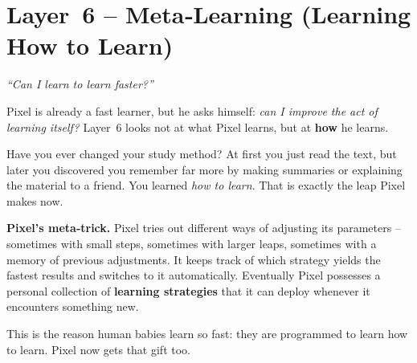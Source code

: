 \section{Layer~6 – Meta‑Learning (Learning How to Learn)}
\label{sec:layer6}

\begin{tcolorbox}[colback=blue!5, colframe=blue!60, title=\textbf{Superpower: The Meta‑Learner}]
\begin{center}
\textit{“Can I learn to learn faster?”}
\end{center}
\end{tcolorbox}

Pixel is already a fast learner, but he asks himself: \emph{can I
improve the act of learning itself?}  Layer~6 looks not at what Pixel
learns, but at \textbf{how} he learns.

\begin{tcolorbox}[colback=yellow!5, colframe=yellow!80, title=Real‑life analogy]
Have you ever changed your study method?  At first you just read the
text, but later you discovered you remember far more by making
summaries or explaining the material to a friend.  You learned
\emph{how to learn}.  That is exactly the leap Pixel makes now.
\end{tcolorbox}

\textbf{Pixel’s meta‑trick.}
Pixel tries out different ways of adjusting its parameters – sometimes
with small steps, sometimes with larger leaps, sometimes with a memory
of previous adjustments.  It keeps track of which strategy yields the
fastest results and switches to it automatically.  Eventually Pixel
possesses a personal collection of \textbf{learning strategies} that
it can deploy whenever it encounters something new.

This is the reason human babies learn so fast: they are programmed to
learn how to learn.  Pixel now gets that gift too.